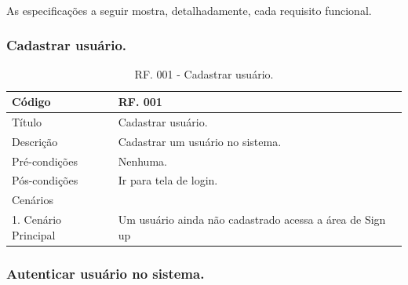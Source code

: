 \documentclass[11pt]{article}
\begin{document}
    \paragraph{}
    As especificações a seguir mostra, detalhadamente, cada requisito funcional.
    
      \subsubsection{Cadastrar usuário.}
      
        \begin{table}[h]
          \begin{center}
              \begin{tabular}{ | p{5cm} | p{10cm} | }
                \hline
                Código\cellcolor{gray} & RF. 001\cellcolor{gray} \\
                \hline
                Título & Cadastrar usuário. \\
                \hline
                Descrição & Cadastrar um usuário no sistema. \\
                \hline
                Pré-condições & Nenhuma. \\
                \hline
                Pós-condições & Ir para tela de login. \\
                \hline
                Cenários &   \\
                \hline
                1.  Cenário Principal & Um usuário ainda não cadastrado acessa a área de Sign up \\
                \hline
              \end{tabular}
            \caption{RF. 001 - Cadastrar usuário.}
          \end{center}
        \end{table}

      \subsubsection{Autenticar usuário no sistema.}
\end{document}

